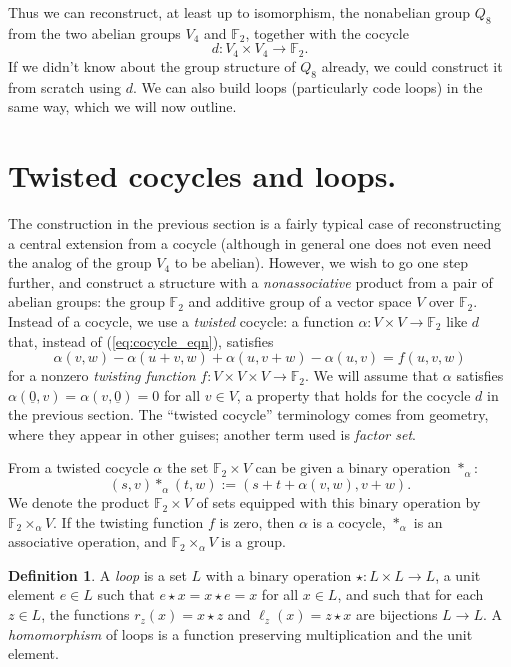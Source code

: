 \documentclass{article}
\theoremstyle{plain}
\theoremstyle{definition}
\newtheorem*{definition}{Definition}
\def \FF {\mathbb{F}}
\begin{document}
Thus we can reconstruct, at least up to isomorphism, the nonabelian group $Q_8$ from the two abelian groups $V_4$ and $\FF_2$, together with the cocycle
\[
	d\colon V_4\times V_4\to \FF_2.
\]
If we didn't know about the group structure of $Q_8$ already, we could construct it from scratch using $d$.
We can also build loops (particularly code loops) in the same way, which we will now outline.


\section{Twisted cocycles and loops.}

The construction in the previous section is a fairly typical case of reconstructing a central extension from a cocycle (although in general one does not even need the analog of the group $V_4$ to be abelian). 
However, we wish to go one step further, and construct a structure with a \emph{nonassociative} product from a pair of abelian groups: the group $\FF_2$ and additive group of a vector space $V$ over $\FF_2$.
Instead of a cocycle, we use a \emph{twisted} cocycle: a function $\alpha\colon V\times V \to \FF_2$ like $d$ that, instead of (\ref{eq:cocycle_eqn}), satisfies
\[
	\alpha(v,w)-\alpha(u+v,w)+\alpha(u,v+w)-\alpha(u,v) = f(u,v,w)
\]
for a nonzero \emph{twisting function} $f\colon V\times V\times V \to \FF_2$. We will assume that $\alpha$ satisfies $\alpha(\underline{0},v)=\alpha(v,\underline{0}) = 0$ for all $v\in V$, a property that holds for the cocycle $d$ in the previous section.
The ``twisted cocycle'' terminology comes from geometry, where they appear in other guises; another term used is \emph{factor set}.

From a twisted cocycle $\alpha$ the set $\FF_2 \times V$ can be given a binary operation $\ast_\alpha$:
\begin{equation}\label{eq:loop_extension_prod}
	(s,v)\ast_\alpha(t,w):=(s+ t+ \alpha(v,w),v+w).
\end{equation}
We denote the product $\FF_2 \times V$ of sets equipped with this binary operation by $\FF_2\times_\alpha V$. If the twisting function $f$ is zero, then $\alpha$ is a cocycle, $\ast_\alpha$ is an associative operation, and $\FF_2\times_\alpha V$ is a group.

\begin{definition}
A \emph{loop} is a set $L$ with a binary operation $\star\colon L\times L \to L$, a unit element $e\in L$ such that $e\star x = x \star e = x$ for all $x\in L$, and such that for each $z\in L$, the functions $r_z(x) = x \star z$ and $\ell_z(x)=z\star x$ are bijections $L\to L$. A \emph{homomorphism} of loops is a function preserving multiplication and the unit element.
\end{definition}
\end{document}
